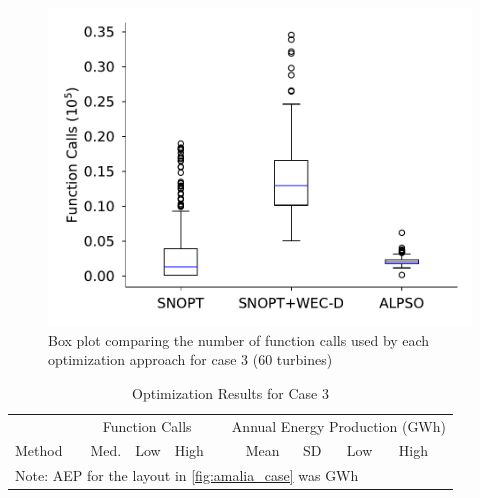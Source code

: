 \documentclass[a4paper]{jpconf}
\begin{document}
\begin{figure}[ht]
	\centering
	\begin{minipage}[t]{18pc}
		\centering
		\includegraphics[width=\textwidth]{final_images/results/60turbs_results_alpso_fcalls}  
		\caption{Box plot comparing the number of function calls used by each optimization approach for case 3 (60 turbines)}
		\label{fig:60-fcalls}
	\end{minipage} 
\end{figure}

%

\begin{table}
	\caption{Optimization Results for Case 3}
	\label{tab:case3}
	\centering
	\begin{tabular}{lcrrrcrrrrr}
		\br
		& & \multicolumn{3}{c}{Function Calls} &  & \multicolumn{5}{c}{Annual Energy Production (GWh) } \\
		\cline{3-5}\cline{7-11}
		Method  & & Med. & Low & High & & Mean & SD & Low & High\\
		\cline{1-1}\cline{3-5}\cline{7-11}
		\multicolumn{11}{p{0.7\textwidth}}{Note: AEP for the layout in \cref{fig:amalia_case} was  GWh} 
	\end{tabular}
\end{table}
\end{document}

